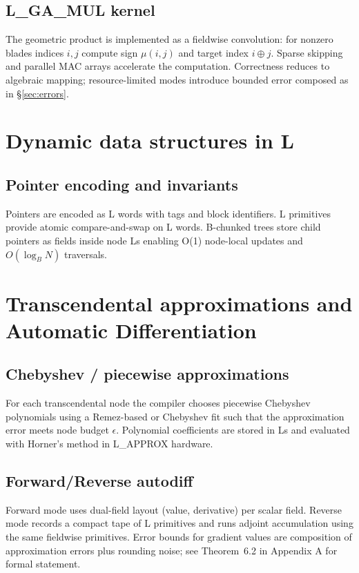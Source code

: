 \documentclass[11pt]{article}
\theoremstyle{definition}
\theoremstyle{plain}
\begin{document}
\subsection{L\_GA\_MUL kernel}
The geometric product is implemented as a fieldwise convolution: for nonzero blades indices \(i,j\) compute sign \(\mu(i,j)\) and target index \(i\oplus j\). Sparse skipping and parallel MAC arrays accelerate the computation. Correctness reduces to algebraic mapping; resource-limited modes introduce bounded error composed as in \S\ref{sec:errors}.

\section{Dynamic data structures in L}
\subsection{Pointer encoding and invariants}
Pointers are encoded as L words with tags and block identifiers. L primitives provide atomic compare-and-swap on L words. B-chunked trees store child pointers as fields inside node Ls enabling O(1) node-local updates and \(O(\log_B N)\) traversals.

\section{Transcendental approximations and Automatic Differentiation}
\subsection{Chebyshev / piecewise approximations}
For each transcendental node the compiler chooses piecewise Chebyshev polynomials using a Remez-based or Chebyshev fit such that the approximation error meets node budget \(\epsilon\). Polynomial coefficients are stored in Ls and evaluated with Horner's method in L\_APPROX hardware.

\subsection{Forward/Reverse autodiff}
Forward mode uses dual-field layout (value, derivative) per scalar field. Reverse mode records a compact tape of L primitives and runs adjoint accumulation using the same fieldwise primitives. Error bounds for gradient values are composition of approximation errors plus rounding noise; see Theorem~6.2 in Appendix A for formal statement.
\end{document}
